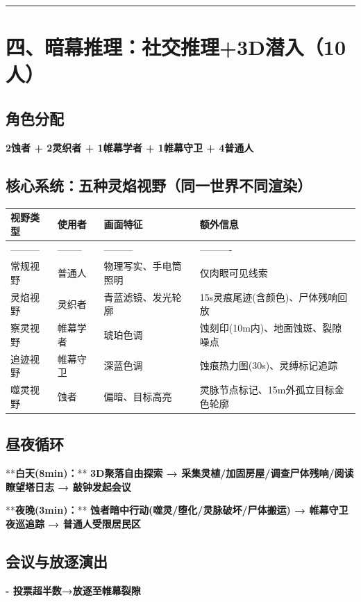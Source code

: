 \documentclass[12pt,a4paper,openany]{ctexbook}
\begin{document}
\bigskip\hrule\bigskip


\chapter{四、暗幕推理：社交推理+3D潜入（10人）}


\section*{角色分配}

\textbf{2蚀者 + 2灵织者 + 1帷幕学者 + 1帷幕守卫 + 4普通人}


\section*{核心系统：五种灵焰视野（同一世界不同渲染）}


\begin{tabular}{|l|l|l|l|}
\hline
视野类型 & 使用者 & 画面特征 & 额外信息 \\
\hline
--------- & -------- & --------- & ---------- \\
常规视野 & 普通人 & 物理写实、手电筒照明 & 仅肉眼可见线索 \\
灵焰视野 & 灵织者 & 青蓝滤镜、发光轮廓 & 15s灵痕尾迹(含颜色)、尸体残响回放 \\
察灵视野 & 帷幕学者 & 琥珀色调 & 蚀刻印(10m内)、地面蚀斑、裂隙噪点 \\
追迹视野 & 帷幕守卫 & 深蓝色调 & 蚀痕热力图(30s)、灵缚标记追踪 \\
噬灵视野 & 蚀者 & 偏暗、目标高亮 & 灵脉节点标记、15m外孤立目标金色轮廓 \\
\hline
\end{tabular}


\section*{昼夜循环}


**\textbf{白天(8min)：}**\textbf{ 3D聚落自由探索 → 采集灵植/加固房屋/调查尸体残响/阅读瞭望塔日志 → 敲钟发起会议}


**\textbf{夜晚(3min)：}**\textbf{ 蚀者暗中行动(噬灵/堕化/灵脉破坏/尸体搬运) → 帷幕守卫夜巡追踪 → 普通人受限居民区}


\section*{会议与放逐演出}


\textbf{- 投票超半数→放逐至帷幕裂隙}
\end{document}
